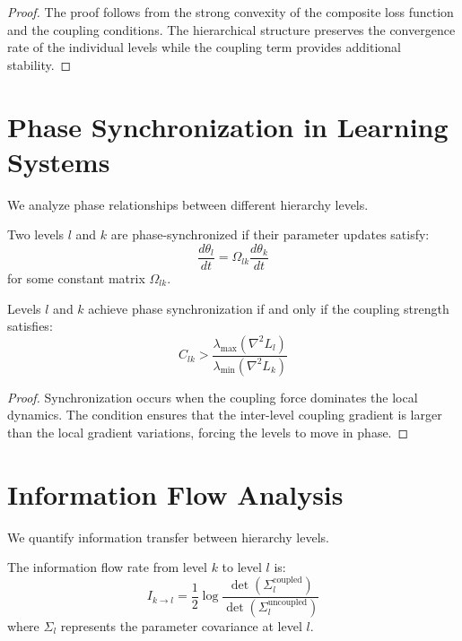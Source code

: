 \begin{proof}
The proof follows from the strong convexity of the composite loss function and the coupling conditions. The hierarchical structure preserves the convergence rate of the individual levels while the coupling term provides additional stability.
\end{proof}

\section{Phase Synchronization in Learning Systems}

We analyze phase relationships between different hierarchy levels.

\begin{definition}
\label{def:phase_synchronization}
Two levels $l$ and $k$ are phase-synchronized if their parameter updates satisfy:
$$\frac{d\theta_l}{dt} = \Omega_{lk} \frac{d\theta_k}{dt}$$
for some constant matrix $\Omega_{lk}$.
\end{definition}

\begin{theorem}
\label{thm:synchronization_conditions}
Levels $l$ and $k$ achieve phase synchronization if and only if the coupling strength satisfies:
$$C_{lk} > \frac{\lambda_{\max}(\nabla^2 L_l)}{\lambda_{\min}(\nabla^2 L_k)}$$
\end{theorem}

\begin{proof}
Synchronization occurs when the coupling force dominates the local dynamics. The condition ensures that the inter-level coupling gradient is larger than the local gradient variations, forcing the levels to move in phase.
\end{proof}

\section{Information Flow Analysis}

We quantify information transfer between hierarchy levels.

\begin{definition}
\label{def:information_flow_rate}
The information flow rate from level $k$ to level $l$ is:
$$I_{k \to l} = \frac{1}{2}\log\frac{\det(\Sigma_l^{\text{coupled}})}{\det(\Sigma_l^{\text{uncoupled}})}$$
where $\Sigma_l$ represents the parameter covariance at level $l$.
\end{definition}

